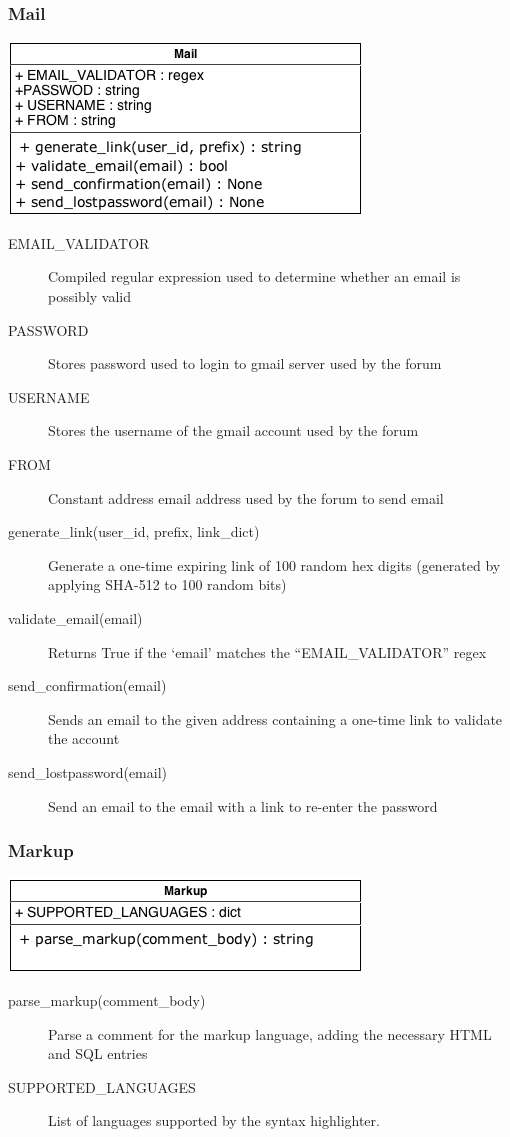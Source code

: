 \documentclass[12pt]{scrartcl}
\begin{document}
\subsubsection{Mail}
\includegraphics[keepaspectratio]{umls/mail_uml.png}
\begin{description}
\item [EMAIL\_VALIDATOR] Compiled regular expression used to determine whether an email is possibly valid
\item [PASSWORD] Stores password used to login to gmail server used by the forum
\item [USERNAME] Stores the username of the gmail account used by the forum
\item [FROM] Constant address email address used by the forum to send email
\item [generate\_link(user\_id, prefix, link\_dict)] Generate a one-time expiring link of 100 random hex digits (generated by applying SHA-512 to 100 random bits)
\item [validate\_email(email)] Returns True if the ‘email’ matches the “EMAIL\_VALIDATOR” regex
\item [send\_confirmation(email)] Sends an email to the given address containing a one-time link to validate the account
\item [send\_lostpassword(email)] Send an email to the email with a link to re-enter the password
\end{description}

\subsubsection{Markup}
\includegraphics[keepaspectratio]{umls/markup_uml.png}
\begin{description}
\item [parse\_markup(comment\_body)] Parse a comment for the markup language, adding the necessary HTML and SQL entries
\item [SUPPORTED\_LANGUAGES] List of languages supported by the syntax highlighter.
\end{description}
\end{document}
